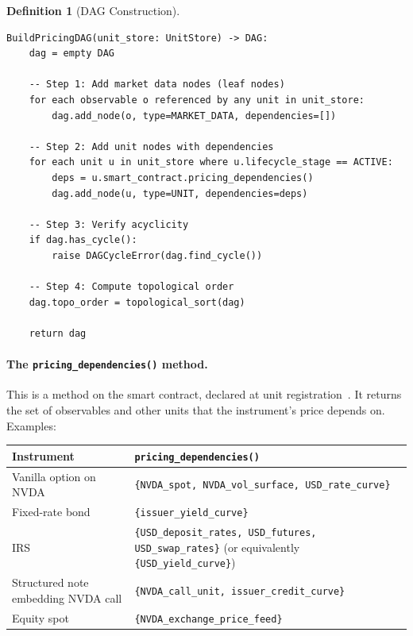 \documentclass[11pt,a4paper]{article}
\newtheorem{definition}{Definition}[section]
\begin{document}
\begin{definition}[DAG Construction]
\label{def:dag-construction}
\begin{lstlisting}
BuildPricingDAG(unit_store: UnitStore) -> DAG:
    dag = empty DAG

    -- Step 1: Add market data nodes (leaf nodes)
    for each observable o referenced by any unit in unit_store:
        dag.add_node(o, type=MARKET_DATA, dependencies=[])

    -- Step 2: Add unit nodes with dependencies
    for each unit u in unit_store where u.lifecycle_stage == ACTIVE:
        deps = u.smart_contract.pricing_dependencies()
        dag.add_node(u, type=UNIT, dependencies=deps)

    -- Step 3: Verify acyclicity
    if dag.has_cycle():
        raise DAGCycleError(dag.find_cycle())

    -- Step 4: Compute topological order
    dag.topo_order = topological_sort(dag)

    return dag
\end{lstlisting}
\end{definition}

\paragraph{The \texttt{pricing\_dependencies()} method.}  This is a method on the smart contract, declared at unit registration~\cite[\S3.4]{ledger}.  It returns the set of observables and other units that the instrument's price depends on.  Examples:

\begin{center}
\small
\begin{tabular}{l p{8cm}}
\toprule
\textbf{Instrument} & \textbf{\texttt{pricing\_dependencies()}} \\
\midrule
Vanilla option on NVDA & \texttt{\{NVDA\_spot, NVDA\_vol\_surface, USD\_rate\_curve\}} \\
Fixed-rate bond & \texttt{\{issuer\_yield\_curve\}} \\
IRS & \texttt{\{USD\_deposit\_rates, USD\_futures, USD\_swap\_rates\}} (or equivalently \texttt{\{USD\_yield\_curve\}}) \\
Structured note embedding NVDA call & \texttt{\{NVDA\_call\_unit, issuer\_credit\_curve\}} \\
Equity spot & \texttt{\{NVDA\_exchange\_price\_feed\}} \\
\bottomrule
\end{tabular}
\end{center}
\end{document}

